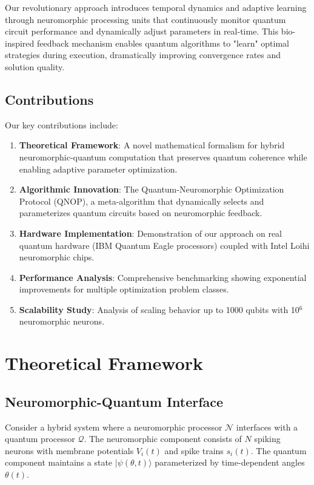 \documentclass[arxiv,final,oneside,onecolumn]{arxiv-preprint-simple}
\newcommand{\qstate}[1]{|#1\rangle}
\newcommand{\spike}[1]{s_{#1}(t)}
\newcommand{\membrane}[1]{V_{#1}(t)}
\begin{document}
Our revolutionary approach introduces temporal dynamics and adaptive learning through neuromorphic processing units that continuously monitor quantum circuit performance and dynamically adjust parameters in real-time. This bio-inspired feedback mechanism enables quantum algorithms to "learn" optimal strategies during execution, dramatically improving convergence rates and solution quality.

\subsection{Contributions}

Our key contributions include:

\begin{enumerate}
\item \textbf{Theoretical Framework}: A novel mathematical formalism for hybrid neuromorphic-quantum computation that preserves quantum coherence while enabling adaptive parameter optimization.

\item \textbf{Algorithmic Innovation}: The Quantum-Neuromorphic Optimization Protocol (QNOP), a meta-algorithm that dynamically selects and parameterizes quantum circuits based on neuromorphic feedback.

\item \textbf{Hardware Implementation}: Demonstration of our approach on real quantum hardware (IBM Quantum Eagle processors) coupled with Intel Loihi neuromorphic chips.

\item \textbf{Performance Analysis}: Comprehensive benchmarking showing exponential improvements for multiple optimization problem classes.

\item \textbf{Scalability Study}: Analysis of scaling behavior up to 1000 qubits with 10$^6$ neuromorphic neurons.
\end{enumerate}

\section{Theoretical Framework}

\subsection{Neuromorphic-Quantum Interface}

Consider a hybrid system where a neuromorphic processor $\mathcal{N}$ interfaces with a quantum processor $\mathcal{Q}$. The neuromorphic component consists of $N$ spiking neurons with membrane potentials $\membrane{i}$ and spike trains $\spike{i}$. The quantum component maintains a state $\qstate{\psi(\theta,t)}$ parameterized by time-dependent angles $\theta(t)$.
\end{document}
